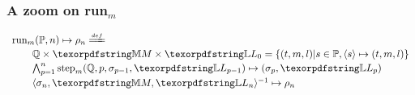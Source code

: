 \documentclass{pres}
\begin{document}
\begin{frame}
  \frametitle{A zoom on run$_m$}

  $$
  \begin{array}{l}
    \runH{\foUnifPb}{n}{\rho} \deff \vspace{2pt}\\
      \qquad \hoUnifPb \times \mapStore \times \linkStore_0 = \{ (t,m,l) | s \in \foUnifPb, \C{s}{t}{m}{l} \}\vspace{2pt}\\
      \qquad \runHD{\hoUnifPb}{n}{\linkStore}\vspace{2pt}\\
      \qquad \D{\sigma_{n}}{\mapStore}{\linkStore_{n}}{\rho_{n}}
    \end{array}
  $$    

\end{frame}
\end{document}
